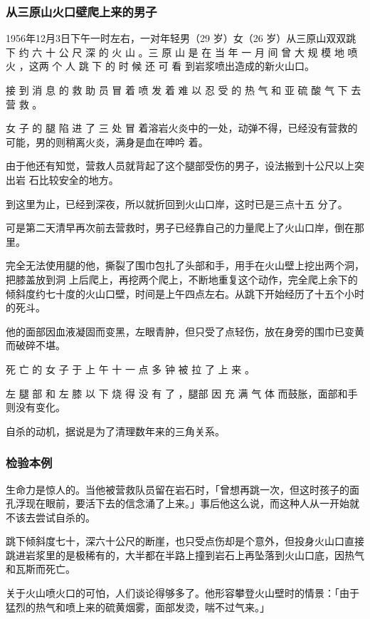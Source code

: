 \documentclass[UTF8]{ctexart}
\begin{document}
\subsubsection*{从三原山火口壁爬上来的男子}

1956年12月3日下午一时左右，一对年轻男（29 岁）女（26 岁）从三原山双双跳下 约 六 十 公 尺 深 的 火 山 。三 原 山 是 在 当 年 一 月 间 曾 大 规 模 地 喷 火 ，这两 个 人 跳 下 的 时 候 还 可 看 到岩浆喷出造成的新火山口。

接 到 消 息 的 救 助 员 冒 着 喷 发 着 难 以 忍 受 的 热 气 和 亚 硫 酸 气 下 去 营 救 。

女 子 的 腿 陷 进 了 三 处 冒 着溶岩火炎中的一处，动弹不得，已经没有营救的可能，男的则稍离火炎，满身是血在呻吟 着。

由于他还有知觉，营救人员就背起了这个腿部受伤的男子，设法搬到十公尺以上突出岩 石比较安全的地方。

到这里为止，已经到深夜，所以就折回到火山口岸，这时已是三点十五 分了。

可是第二天清早再次前去营救时，男子已经靠自己的力量爬上了火山口岸，倒在那里。

完全无法使用腿的他，撕裂了围巾包扎了头部和手，用手在火山壁上挖出两个洞，把膝盖放到洞 上后爬上，再挖两个爬上，不断地重复这个动作，完全爬上余下的倾斜度约七十度的火山口壁，时间是上午四点左右。从跳下开始经历了十五个小时的死斗。

他的面部因血液凝固而变黑，左眼青肿，但只受了点轻伤，放在身旁的围巾已变黄而破碎不堪。 

死 亡 的 女 子 于 上 午 十 一 点 多 钟 被 拉 了 上 来 。

左 腿 部 和 左 膝 以 下 烧 得 没 有 了 ，腿部 因 充 满 气 体 而鼓胀，面部和手则没有变化。

自杀的动机，据说是为了清理数年来的三角关系。

\subsubsection*{检验本例}

生命力是惊人的。当他被营救队员留在岩石时，「曾想再跳一次，但这时孩子的面孔浮现在眼前，要活下去的信念涌了上来。」事后他这么说，而这种人从一开始就不该去尝试自杀的。

跳下倾斜度七十，深六十公尺的断崖，也只受点伤却是个意外，但投身火山口直接跳进岩浆里的是极稀有的，大半都在半路上撞到岩石上再坠落到火山口底，因热气和瓦斯而死亡。

关于火山喷火口的可怕，人们谈论得够多了。他形容攀登火山壁时的情景：「由于猛烈的热气和喷上来的硫黄烟雾，面部发烫，喘不过气来。」
\end{document}

